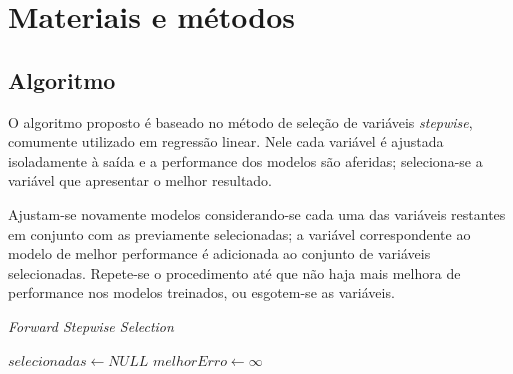 \chapter[Materiais e métodos]{Materiais e métodos}

\section{Algoritmo}

O algoritmo proposto é baseado no método de seleção de variáveis \textit{stepwise}, comumente utilizado em regressão linear. 
Nele cada variável é ajustada isoladamente à saída e a performance dos modelos são aferidas; seleciona-se a variável que apresentar
o melhor resultado. 

Ajustam-se novamente modelos considerando-se cada uma das variáveis restantes em conjunto com as previamente selecionadas; a 
variável correspondente ao modelo de melhor performance é adicionada ao conjunto de variáveis selecionadas. Repete-se o procedimento
até que não haja mais melhora de performance nos modelos treinados, ou esgotem-se as variáveis.

\begin{algorithm}
    \caption{\textit{Forward Stepwise Selection}}
    \begin{algorithmic}
            \State $selecionadas \gets NULL$
            \Repeat
            \State $melhorErro \gets \infty$
            
            \EndFor
        \EndFunction
    \end{algorithmic}
\end{algorithm}

